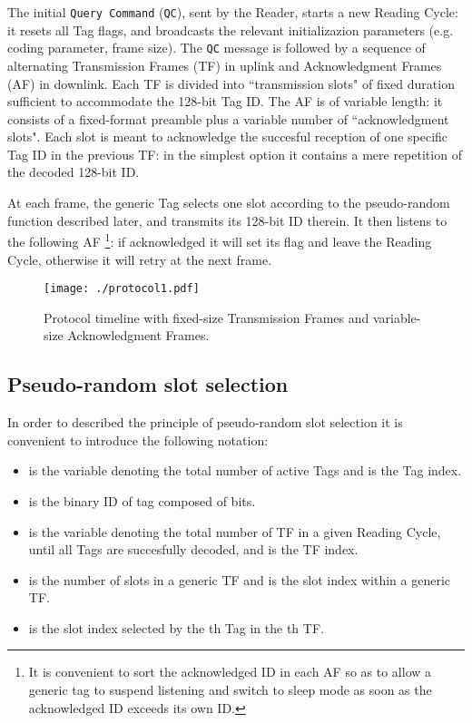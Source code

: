 \documentclass[12pt,draftcls,onecolumn]{IEEEtran}
\begin{document}
The initial \texttt{Query Command} (\texttt{QC}), sent by the Reader, starts a new Reading Cycle: it resets all Tag flags,  and broadcasts the relevant initializazion parameters (e.g. coding parameter, frame size).
The \texttt{QC} message is followed by a sequence of alternating Transmission Frames (TF) in uplink and Acknowledgment Frames (AF) in downlink.
Each TF  is divided into  ``transmission slots" of fixed duration sufficient to accommodate the 128-bit Tag ID.
The AF is of variable length: it consists of a fixed-format preamble plus a variable number of ``acknowledgment slots". Each slot is meant to acknowledge the succesful reception of one specific Tag ID in the previous TF: in the simplest option it contains a mere repetition of the decoded 128-bit ID.

At each frame, the generic Tag selects one slot according to the pseudo-random function described later, and transmits its 128-bit ID therein.
It then listens  to the following AF \footnote{It is convenient to sort the acknowledged ID in each AF so as to allow a generic tag to suspend listening and switch to sleep mode as soon as the acknowledged ID exceeds its own ID.}:
if  acknowledged it will set its flag and leave the Reading Cycle, otherwise it will retry at the next frame.

\begin{figure}[tb]
\centering
\texttt{[image: ./protocol1.pdf]}

\caption{Protocol timeline with fixed-size Transmission Frames
and variable-size Acknowledgment Frames.  }
\label{fig:proto}
\end{figure}

\newcommand{\myxi}{\mathbf{\boldsymbol{x}}_{i}}

\subsection{Pseudo-random slot selection}\label{sec:selalg}

In order to described the principle of pseudo-random slot selection it is convenient to introduce the following notation:
\begin{itemize}
\item  is the variable denoting the total number of active Tags and  is the Tag index.
\item   is the binary ID of tag  composed of  bits.
\item  is the variable denoting the total number of TF in a given Reading Cycle, until all Tags are succesfully decoded, and  is the TF index.
\item  is the number of slots in a generic TF and   is the slot index within a generic TF.
\item  is the slot index selected by the th Tag in the th TF.
\end{itemize}
\end{document}
